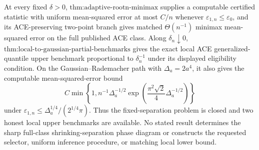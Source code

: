 At every fixed \(\delta>0\), \(\text{thm:adaptive-rootn-minimax}\) supplies a computable certified statistic with uniform mean-squared error at most \(C/n\) whenever \(\varepsilon_{1,n}\le\varepsilon_0\), and its ACE-preserving two-point branch gives matched \(\Theta(n^{-1})\) minimax mean-squared error on the full published ACE class.  Along \(\delta_n\downarrow0\), \(\text{thm:local-to-gaussian-partial-benchmarks}\) gives the exact local ACE generalized-quantile upper benchmark proportional to \(\delta_n^{-1}\) under its displayed eligibility condition.  On the Gaussian--Rademacher path with \(\Delta_a=2a^4\), it also gives the computable mean-squared-error bound
\[
 C\min\!\left\{1,n^{-1}\Delta_a^{-1/2}
 \exp\!\left(\frac{\pi^2\sqrt2}{4}\Delta_a^{-1/2}\right)\right\}
\]
under \(\varepsilon_{1,n}\le\Delta_a^{1/4}/(2^{1/4}\pi)\).  Thus the fixed-separation problem is closed and two honest local upper benchmarks are available.  No stated result determines the sharp full-class shrinking-separation phase diagram or constructs the requested selector, uniform inference procedure, or matching local lower bound.